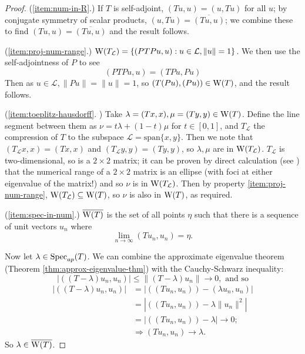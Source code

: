 \documentclass[../main.tex]{subfiles}
\begin{document}
\begin{proof}
(\ref{item:num-in-R}.) If $T$ is self-adjoint, $(Tu, u) = (u, Tu)$ for all $u$; by conjugate symmetry of scalar products, $(u, Tu) = \overline{(Tu, u)}$; we combine these to find $(Tu, u) = \overline{(Tu, u)}$ and the result follows. 

(\ref{item:proj-num-range}.) $\mathrm{W}(T_\mathcal{L}) = \{( PTPu, u ) : u \in \mathcal{L}, \|u\|=1\}$.
We then use the self-adjointness of $P$ to see
$$( PTPu, u ) = ( TPu, Pu )$$
Then as $u \in \mathcal{L}, \|Pu\| = \|u\| = 1$,
so $( T(Pu), (Pu) ) \in \mathrm{W}(T)$, and the result follows.

(\ref{item:toeplitz-hausdorff}. \cite{gustafson1997numerical}) Take $\lambda = (Tx, x), \mu = (Ty, y) \in \mathrm{W}(T)$. Define the line segment between them as 
$\nu = t\lambda + (1-t)\mu$ for $t \in [0, 1]$, and $T_\mathcal{L}$ the compression of $T$ to the subspace 
$\mathcal{L} = \text{span}\{x, y\}$. Then we note that $(T_\mathcal{L} x, x) = (Tx, x)$ and $(T_\mathcal{L} y, y) = (Ty, y)$, so $\lambda, \mu$ are in
$\mathrm{W}(T_\mathcal{L})$. $T_\mathcal{L}$ is two-dimensional, so is a $2 \times 2$ matrix; it can be proven by direct calculation (see \cite{gustafson1997numerical}) that the numerical range of a $2 \times 2$ matrix is an ellipse (with foci at either eigenvalue of the matrix!) and so $\nu$ is in $\mathrm{W}(T_\mathcal{L})$.
Then by property \ref{item:proj-num-range}, $\mathrm{W}(T_\mathcal{L}) \subseteq \mathrm{W}(T)$, so $\nu$ is also in $\mathrm{W}(T)$, as required.

(\ref{item:spec-in-num}.) $\overline{\mathrm{W}(T)}$ is the set of all points $\eta$ such that there is a sequence of unit vectors $u_n$ where
$$\lim_{n\rightarrow \infty}( Tu_n, u_n ) = \eta.$$

Now let $\lambda \in \mathrm{Spec}_{ap}(T)$. We can combine the approximate eigenvalue theorem (Theorem \ref{thm:approx-eigenvalue-thm}) with the Cauchy-Schwarz inequality:
$$|( (T - \lambda)u_n, u_n )| \leq \|(T - \lambda)u_n\| \rightarrow 0,\text{ and so}$$
\begin{equation*}
\begin{split}
|( (T - \lambda)u_n, u_n )| &  = |( (Tu_n, u_n) ) - ( \lambda u_n, u_n )| \\
& = |( (Tu_n, u_n) ) - \lambda \|u_n\|^2| \\
& = |( (Tu_n, u_n) ) - \lambda| \rightarrow 0; \\
& \Rightarrow ( Tu_n, u_n ) \rightarrow \lambda.
\end{split}
\end{equation*}
So $\lambda \in \overline{\mathrm{W}(T)}$.
\end{proof}
\end{document}

